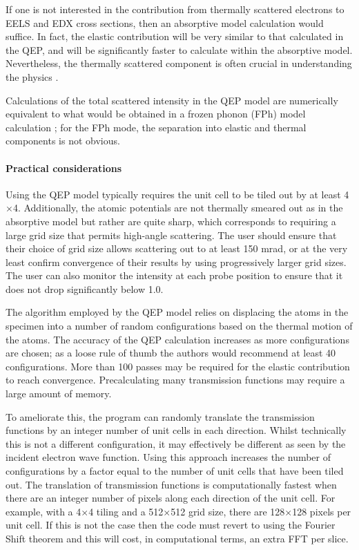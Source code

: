 \documentclass[12pt,a4paper]{article}
\newcommand{\by}{$\times$}
\begin{document}
If one is not interested in the contribution from thermally scattered electrons to EELS and EDX cross sections, then an absorptive model calculation would suffice.
In fact, the elastic contribution will be very similar to that calculated in the QEP, and will be significantly faster to calculate within the absorptive model.
Nevertheless, the thermally scattered component is often crucial in understanding the physics \cite{Forbes2012}.

Calculations of the total scattered intensity in the QEP model are numerically equivalent to what would be obtained in a frozen phonon (FPh) model calculation \cite{LXS}; for the FPh mode, the separation into elastic and thermal components is not obvious.

\paragraph{Practical considerations}

Using the QEP model typically requires the unit cell to be tiled out by at least 4\by4.
Additionally, the atomic potentials are not thermally smeared out as in the absorptive model but rather are quite sharp, which corresponds to requiring a large grid size that permits high-angle scattering.
The user should ensure that their choice of grid size allows scattering out to at least 150 mrad, or at the very least confirm convergence of their results by using progressively larger grid sizes.
The user can also monitor the intensity at each probe position to ensure that it does not drop significantly below 1.0.

The algorithm employed by the QEP model relies on displacing the atoms in the specimen into a number of random configurations based on the thermal motion of the atoms.
The accuracy of the QEP calculation increases as more configurations are chosen; as a loose rule of thumb the authors would recommend at least 40 configurations.
More than 100 passes may be required for the elastic contribution to reach convergence.
Precalculating many transmission functions may require a large amount of memory.

To ameliorate this, the program can randomly translate the transmission functions by an integer number of unit cells in each direction.
Whilst technically this is not a different configuration, it may effectively be different as seen by the incident electron wave function.
Using this approach increases the number of configurations by a factor equal to the number of unit cells that have been tiled out.
The translation of transmission functions is computationally fastest when there are an integer number of pixels along each direction of the unit cell.
For example, with a 4\by4 tiling and a 512\by512 grid size, there are 128\by128 pixels per unit cell.
If this is not the case then the code must revert to using the Fourier Shift theorem and this will cost, in computational terms, an extra FFT per slice.
\end{document}
